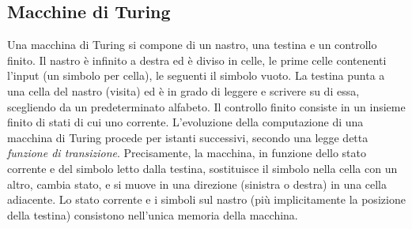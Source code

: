 \subsection{Macchine di Turing}
Una macchina di Turing si compone di un nastro, una testina e un controllo finito. Il nastro è infinito a destra ed è diviso in celle, le prime celle contenenti l'input (un simbolo per cella), le seguenti il simbolo vuoto. La testina punta a una cella del nastro (visita) ed è in grado di leggere e scrivere su di essa, scegliendo da un predeterminato alfabeto. Il controllo finito consiste in un insieme finito di stati di cui uno corrente. L'evoluzione della computazione di una macchina di Turing procede per istanti successivi, secondo una legge detta \emph{funzione di transizione}. Precisamente, la macchina, in funzione dello stato corrente e del simbolo letto dalla testina, sostituisce il simbolo nella cella con un altro, cambia stato, e si muove in una direzione (sinistra o destra) in una cella adiacente. Lo stato corrente e i simboli sul nastro (più implicitamente la posizione della testina) consistono nell'unica memoria della macchina.

